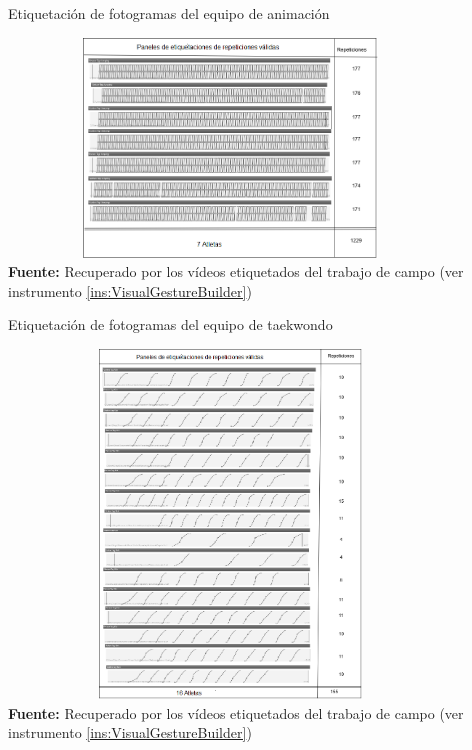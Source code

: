 \begin{table}[H]
	\caption{Etiquetaci\'on de fotogramas del equipo de animaci\'on}
	\label{fig:etiquetaCheerleader}
	\centering
	\includegraphics[width=445px,height=220px]{graphics/resultados/GraSegCheerleaders.PNG} \\
	\textbf{Fuente:} Recuperado por los v\'ideos etiquetados del trabajo de campo (ver instrumento \ref{ins:VisualGestureBuilder})
\end{table}
\begin{table}[H]
	\caption{Etiquetaci\'on de fotogramas del equipo de taekwondo}
	\label{fig:etiquetaTaekwondo}
	\centering
	\includegraphics[width=445px,height=350px]{graphics/resultados/GraSegTaekwondo.PNG} \\
	\textbf{Fuente:} Recuperado por los v\'ideos etiquetados del trabajo de campo (ver instrumento \ref{ins:VisualGestureBuilder})
\end{table}
